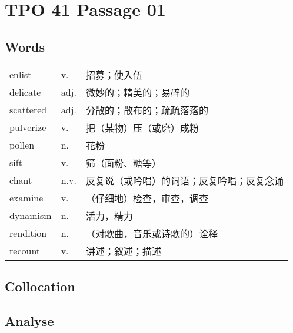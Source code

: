 \section{TPO 41 Passage 01}

\subsection{Words}

\begin{tabular}{lll}
    enlist    & v.   & 招募；使入伍                \\
    delicate  & adj. & 微妙的；精美的；易碎的           \\
    scattered & adj. & 分散的；散布的；疏疏落落的         \\
    pulverize & v.   & 把（某物）压（或磨）成粉          \\
    pollen    & n.   & 花粉                    \\
    sift      & v.   & 筛（面粉、糖等）              \\
    chant     & n.v. & 反复说（或吟唱）的词语；反复吟唱；反复念诵 \\
    examine   & v.   & （仔细地）检查，审查，调查         \\
    dynamism  & n.   & 活力，精力                 \\
    rendition & n.   & （对歌曲，音乐或诗歌的）诠释        \\
    recount   & v.   & 讲述；叙述；描述              \\
\end{tabular}

\subsection{Collocation}

\newpage

\subsection{Analyse}

